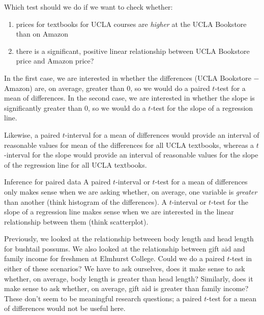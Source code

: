 \begin{examplewrap}
\begin{nexample}
{Which test should we do if we want to check whether:
\begin{enumerate}
\item prices for textbooks for UCLA courses are \emph{higher} at the UCLA Bookstore than on Amazon
\item there is a significant, positive linear relationship between UCLA Bookstore price and Amazon price?
\end{enumerate}}
In the first case, we are interested in whether the differences (UCLA Bookstore $-$ Amazon) are, on average, greater than 0, so we would do a paired $t$-test for a mean of differences.  In the second case, we are interested in whether the slope is significantly greater than 0, so we would do a $t$-test for the slope of a regression line.  
\end{nexample}
\end{examplewrap}

Likewise, a paired $t$-interval for a mean of differences would provide an interval of reasonable values for mean of the differences for all UCLA textbooks, whereas a $t$-interval for the slope would provide an interval of reasonable values for the slope of the regression line for all UCLA textbooks.     


\begin{onebox}{Inference for paired data}
A paired $t$-interval or $t$-test for a mean of differences only makes sense when we are asking whether, on average, one variable is \emph{greater} than another (think histogram of the differences).  A $t$-interval or $t$-test for the slope of a regression line makes sense when we are interested in the linear relationship between them (think scatterplot).  
\end{onebox}


\begin{examplewrap}
\begin{nexample}
{Previously, we looked at the relationship betweeen body length and head length for bushtail possums.  We also looked at the relationship between gift aid and family income for freshmen at Elmhurst College.  Could we do a paired $t$-test in either of these scenarios?}
We have to ask ourselves, does it make sense to ask whether, on average, body length is greater than head length?  Similarly, does it make sense to ask whether, on average, gift aid is greater than family income?  These don't seem to be meaningful research questions; a paired $t$-test for a mean of differences would not be useful here. 
\end{nexample}
\end{examplewrap}

